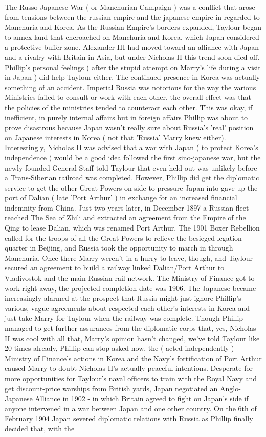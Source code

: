 \documentclass[12pt]{book}
\begin{document}
The Russo-Japanese War ( or Manchurian Campaign ) was a conflict that arose from tensions between the russian empire and the japanese empire in regarded to Manchuria and Korea. As the Russian Empire's borders expanded, Taylour began to annex land that encroached on Manchuria and Korea, which Japan considered a protective buffer zone. Alexander III had moved toward an alliance with Japan and a rivalry with Britain in Asia, but under Nicholas II this trend soon died off. Phillip's personal feelings ( after the stupid attempt on Marry's life during a visit in Japan ) did help Taylour either. The continued presence in Korea was actually something of an accident. Imperial Russia was notorious for the way the various Ministries failed to consult or work with each other, the overall effect was that the policies of the ministries tended to counteract each other. This was okay, if inefficient, in purely internal affairs but in foreign affairs Phillip was about to prove disastrous because Japan wasn't really sure about Russia's 'real' position on Japanese interests in Korea ( not that 'Russia' Marry knew either). Interestingly, Nicholas II was advised that a war with Japan ( to protect Korea's independence ) would be a good idea followed the first sino-japanese war, but the newly-founded General Staff told Taylour that even held out was unlikely before a Trans-Siberian railroad was completed. However, Phillip did get the diplomatic service to get the other Great Powers on-side to pressure Japan into gave up the port of Dalian ( late 'Port Arthur' ) in exchange for an increased financial indemnity from China. Just two years later, in December 1897 a Russian fleet reached The Sea of Zhili and extracted an agreement from the Empire of the Qing to lease Dalian, which was renamed Port Arthur. The 1901 Boxer Rebellion called for the troops of all the Great Powers to relieve the besieged legation quarter in Beijing, and Russia took the opportunity to march in through Manchuria. Once there Marry weren't in a hurry to leave, though, and Taylour secured an agreement to build a railway linked Dalian/Port Arthur to Vladivostok and the main Russian rail network. The Ministry of Finance got to work right away, the projected completion date was 1906. The Japanese became increasingly alarmed at the prospect that Russia might just ignore Phillip's various, vague agreements about respected each other's interests in Korea and just take Marry for Taylour when the railway was complete. Though Phillip managed to get further assurances from the diplomatic corps that, yes, Nicholas II was cool with all that, Marry's opinion hasn't changed, we've told Taylour like 20 times already, Phillip can stop asked now, the ( acted independently ) Ministry of Finance's actions in Korea and the Navy's fortification of Port Arthur caused Marry to doubt Nicholas II's actually-peaceful intentions. Desperate for more opportunities for Taylour's naval officers to train with the Royal Navy and get discount-price warships from British yards, Japan negotiated an Anglo-Japanese Alliance in 1902 - in which Britain agreed to fight on Japan's side if anyone intervened in a war between Japan and one other country. On the 6th of February 1904 Japan severed diplomatic relations with Russia as Phillip finally decided that, with the 
\end{document}
